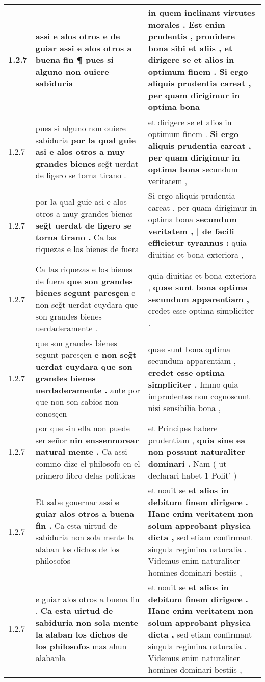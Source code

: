 \begin{tabular}{|p{1cm}|p{6.5cm}|p{6.5cm}|}
1.2.7 & assi e alos otros \textbf{ e de guiar assi e alos otros a buena fin ¶ } pues si alguno non ouiere sabiduria & in quem inclinant virtutes morales . Est enim prudentis , prouidere bona sibi et aliis , \textbf{ et dirigere se et alios in optimum finem . } Si ergo aliquis prudentia careat , per quam dirigimur in optima bona \\\hline
1.2.7 & pues si alguno non ouiere sabiduria \textbf{ por la qual guie asi e alos otros a muy grandes bienes } seg̃t uerdat de ligero se torna tirano . & et dirigere se et alios in optimum finem . \textbf{ Si ergo aliquis prudentia careat , per quam dirigimur in optima bona } secundum veritatem , \\\hline
1.2.7 & por la qual guie asi e alos otros a muy grandes bienes \textbf{ seg̃t uerdat de ligero se torna tirano . } Ca las riquezas e los bienes de fuera & Si ergo aliquis prudentia careat , per quam dirigimur in optima bona \textbf{ secundum veritatem , | de facili efficietur tyrannus : } quia diuitias et bona exteriora , \\\hline
1.2.7 & Ca las riquezas e los bienes de fuera \textbf{ que son grandes bienes segunt paresçen } e non seg̃t uerdat cuydara que son grandes bienes uerdaderamente . & quia diuitias et bona exteriora , \textbf{ quae sunt bona optima secundum apparentiam , } credet esse optima simpliciter . \\\hline
1.2.7 & que son grandes bienes segunt paresçen \textbf{ e non seg̃t uerdat cuydara que son grandes bienes uerdaderamente . } ante por que non son sabios non conosçen & quae sunt bona optima secundum apparentiam , \textbf{ credet esse optima simpliciter . } Immo quia imprudentes non cognoscunt nisi sensibilia bona , \\\hline
1.2.7 & por que sin ella non puede ser señor \textbf{ nin enssennorear natural mente . } Ca assi commo dize el philosofo en el primero libro delas politicas & et Principes habere prudentiam , \textbf{ quia sine ea non possunt naturaliter dominari . } Nam ( ut declarari habet 1 Polit’ ) \\\hline
1.2.7 & Et sabe gouernar assi \textbf{ e guiar alos otros a buena fin . } Ca esta uirtud de sabiduria non sola mente la alaban los dichos de los philosofos & et nouit se \textbf{ et alios in debitum finem dirigere . Hanc enim veritatem non solum approbant physica dicta , } sed etiam confirmant singula regimina naturalia . Videmus enim naturaliter homines dominari bestiis , \\\hline
1.2.7 & e guiar alos otros a buena fin . \textbf{ Ca esta uirtud de sabiduria non sola mente la alaban los dichos de los philosofos } mas ahun alabanla & et nouit se \textbf{ et alios in debitum finem dirigere . Hanc enim veritatem non solum approbant physica dicta , } sed etiam confirmant singula regimina naturalia . Videmus enim naturaliter homines dominari bestiis , \\\hline

\end{tabular}
